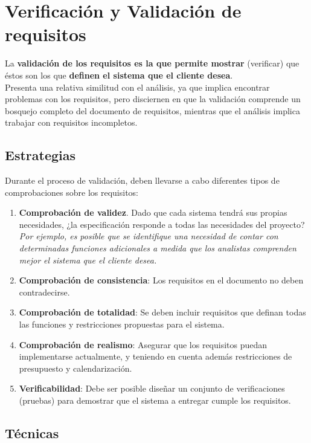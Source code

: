 \section{Verificación y Validación de requisitos}

La \textbf{validación de los requisitos es la que permite mostrar} (verificar) que éstos son los que \textbf{definen el sistema que el cliente desea}.\\

Presenta una relativa similitud con el análisis, ya que implica encontrar problemas con los requisitos, pero disciernen en que la validación comprende un bosquejo completo del documento de requisitos, mientras que el análisis implica trabajar con requisitos incompletos.

\subsection{Estrategias}

Durante el proceso de validación, deben llevarse a cabo diferentes tipos de comprobaciones sobre los requisitos:

\begin{enumerate}
    \item \textbf{Comprobación de validez}. Dado que cada sistema tendrá sus propias necesidades, ¿la especificación responde a todas las necesidades del proyecto? \textit{Por ejemplo, es posible que se identifique una necesidad de contar con determinadas funciones adicionales a medida que los analistas comprenden mejor el sistema que el cliente desea.}
    \item \textbf{Comprobación de consistencia}: Los requisitos en el documento no deben contradecirse.
    \item \textbf{Comprobación de totalidad}: Se deben incluir requisitos que definan todas las funciones y restricciones propuestas para el sistema.
    \item \textbf{Comprobación de realismo}: Asegurar que los requisitos puedan implementarse actualmente, y teniendo en cuenta además restricciones de presupuesto y calendarización.
    \item \textbf{Verificabilidad}: Debe ser posible diseñar un conjunto de verificaciones (pruebas) para demostrar que el sistema a entregar cumple los requisitos.
\end{enumerate}

\subsection{Técnicas}

